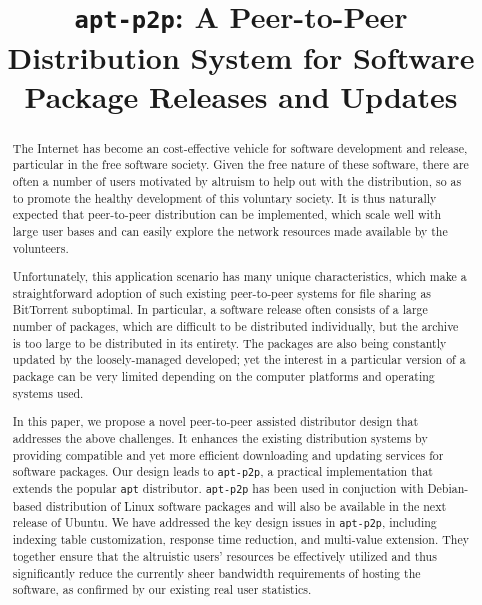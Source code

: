 \documentclass[conference]{IEEEtran}
\begin{document}
\title{\texttt{apt-p2p}: A Peer-to-Peer Distribution System for Software Package Releases and Updates}
\author{
\and
{}
}

\maketitle

\begin{abstract}
The Internet has become an cost-effective
vehicle for software development and release, particular in the free software society.
Given the free nature of these software, there are often a number of users
motivated by altruism to help out with the distribution, so as to promote the healthy development
of this voluntary society. It is thus naturally expected that peer-to-peer distribution can be implemented,
which scale well with large user bases and can easily explore the network resources made available by
the volunteers.

Unfortunately, this application scenario has many unique characteristics, which
make a straightforward adoption of such existing peer-to-peer systems for file sharing as BitTorrent suboptimal. In particular,
a software release often consists of a large number of packages, which are difficult to be distributed individually, but the archive is
too large to be distributed in its entirety. The packages are also being constantly
updated by the loosely-managed developed; yet the interest in a particular version of a package can be very
limited depending on the computer platforms and operating systems used.

In this paper, we propose a novel peer-to-peer assisted distributor design that
addresses the above challenges. It enhances the existing distribution systems by providing compatible and yet more efficient downloading and updating services
for software packages. Our design leads to \texttt{apt-p2p}, a practical implementation that extends the popular \texttt{apt} distributor.  \texttt{apt-p2p}  has been used in conjuction with Debian-based distribution of Linux
software packages and will also be available in the next release of Ubuntu. We have addressed the key design issues in \texttt{apt-p2p}, including indexing table customization,
response time reduction, and multi-value extension. They together ensure
that the altruistic users' resources be effectively utilized and thus significantly reduce the currently
sheer bandwidth requirements of hosting the software, as confirmed by our existing real user statistics.
\end{abstract}
\end{document}
